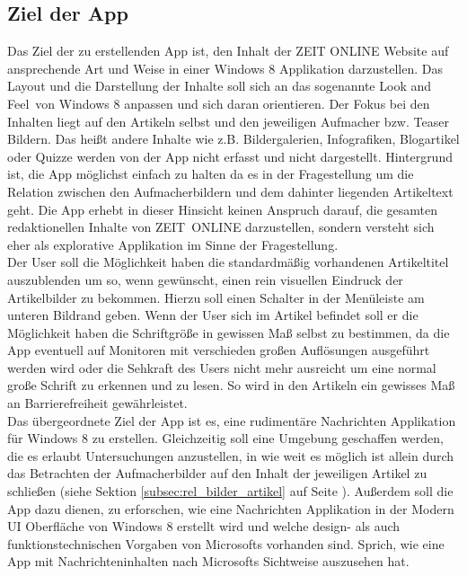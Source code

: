 \documentclass[12pt,a4paper]{scrartcl}
\begin{document}
\subsection{Ziel der App}
\label{subsec:zielderapp}
Das Ziel der zu erstellenden App ist, den Inhalt der ZEIT ONLINE Website auf ansprechende Art und Weise in einer Windows 8 Applikation darzustellen. Das Layout und die Darstellung der Inhalte soll sich an das sogenannte \glqq Look and Feel\grqq\ von Windows 8 anpassen und sich daran orientieren. Der Fokus bei den Inhalten liegt auf den Artikeln selbst und den jeweiligen Aufmacher bzw. Teaser Bildern. Das heißt andere Inhalte wie z.B. Bildergalerien, Infografiken, Blogartikel oder Quizze werden von der App nicht erfasst und nicht dargestellt. Hintergrund ist, die App möglichst einfach zu halten da es in der Fragestellung um die Relation zwischen den Aufmacherbildern und dem dahinter liegenden Artikeltext geht. Die App erhebt in dieser Hinsicht keinen Anspruch darauf, die gesamten redaktionellen Inhalte von \mbox{ZEIT ONLINE} darzustellen, sondern versteht sich eher als explorative Applikation im Sinne der Fragestellung.\\
Der User soll die Möglichkeit haben die standardmäßig vorhandenen Artikeltitel auszublenden um so, wenn gewünscht, einen rein visuellen Eindruck der Artikelbilder zu bekommen. Hierzu soll einen Schalter in der Menüleiste am unteren Bildrand geben. Wenn der User sich im Artikel befindet soll er die Möglichkeit haben die Schriftgröße in gewissen Maß selbst zu bestimmen, da die App eventuell auf Monitoren mit verschieden großen Auflösungen ausgeführt werden wird oder die Sehkraft des Users nicht mehr ausreicht um eine normal große Schrift zu erkennen und zu lesen. So wird in den Artikeln ein gewisses Maß an Barrierefreiheit gewährleistet.\\
Das übergeordnete Ziel der App ist es, eine rudimentäre Nachrichten Applikation für Windows 8 zu erstellen. Gleichzeitig soll eine Umgebung geschaffen werden, die es erlaubt Untersuchungen anzustellen, in wie weit es möglich ist allein durch das Betrachten der Aufmacherbilder auf den Inhalt der jeweiligen Artikel zu schließen (siehe Sektion \ref{subsec:rel_bilder_artikel} auf Seite \pageref{subsec:rel_bilder_artikel}). Außerdem soll die App dazu dienen, zu erforschen, wie eine Nachrichten Applikation in der Modern UI Oberfläche von Windows 8 erstellt wird und welche design- als auch funktionstechnischen Vorgaben von Microsofts vorhanden sind. Sprich, wie eine App mit Nachrichteninhalten nach Microsofts Sichtweise auszusehen hat. 
\end{document}
